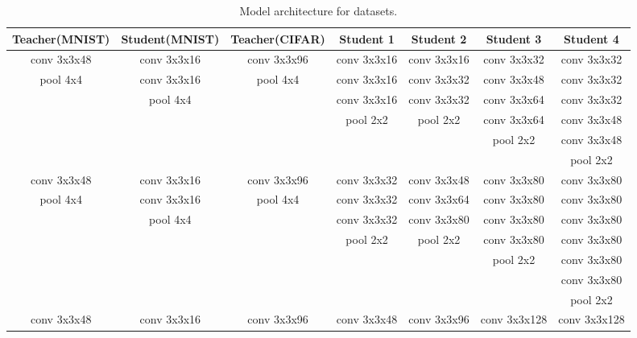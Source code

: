 \documentclass[journal]{IEEEtran}
\begin{document}
\begin{table*}[htb]
\renewcommand\arraystretch{1}
\centering
\small
\setlength{\abovecaptionskip}{0.2cm}
\setlength{\belowcaptionskip}{0.2cm}
\caption{Model architecture for datasets.}
\begin{tabular}{|c|c|c|c|c|c|c|}
\hline
Teacher(MNIST)  &  Student(MNIST)  &  Teacher(CIFAR)  &   Student 1  &  Student 2  &  Student 3  &  Student 4  \\
\hline
\hline
conv 3x3x48  &  conv 3x3x16  &  conv 3x3x96  &  conv 3x3x16  &  conv 3x3x16  &  conv 3x3x32  &  conv 3x3x32  \\
pool 4x4     &  conv 3x3x16  &  pool 4x4     &  conv 3x3x16  &  conv 3x3x32  &  conv 3x3x48  &  conv 3x3x32  \\
           &  pool 4x4     &               &  conv 3x3x16  &  conv 3x3x32  &  conv 3x3x64  &  conv 3x3x32  \\
           &               &               &  pool 2x2     &  pool 2x2     &  conv 3x3x64  &  conv 3x3x48  \\
           &               &               &               &               &  pool 2x2     &  conv 3x3x48  \\
           &               &               &               &               &               &  pool 2x2     \\
\hline
conv 3x3x48  &  conv 3x3x16  &  conv 3x3x96  &  conv 3x3x32  &  conv 3x3x48  &  conv 3x3x80  &  conv 3x3x80  \\
pool 4x4     &  conv 3x3x16  &  pool 4x4     &  conv 3x3x32  &  conv 3x3x64  &  conv 3x3x80  &  conv 3x3x80  \\
           &  pool 4x4     &               &  conv 3x3x32  &  conv 3x3x80  &  conv 3x3x80  &  conv 3x3x80  \\
           &               &               &  pool 2x2     &  pool 2x2     &  conv 3x3x80  &  conv 3x3x80  \\
           &               &               &               &               &  pool 2x2     &  conv 3x3x80  \\
           &               &               &               &               &               &  conv 3x3x80  \\
           &               &               &               &               &               &  pool 2x2     \\
\hline
conv 3x3x48  &  conv 3x3x16  &  conv 3x3x96  &  conv 3x3x48  &  conv 3x3x96  &  conv 3x3x128 &  conv 3x3x128  \\

\end{tabular}
\end{table*}
\end{document}
